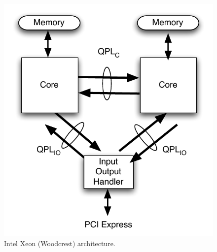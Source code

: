\documentclass[times, 10pt,twocolumn]{IEEEtran}
\begin{document}
\begin{figure}[tbph]
  \centering
  \includegraphics[scale=0.5]{intelnehalem}
  \caption{Intel Xeon (Woodcrest) architecture.}
  \label{fig:intarch}
\end{figure}
\end{document}

